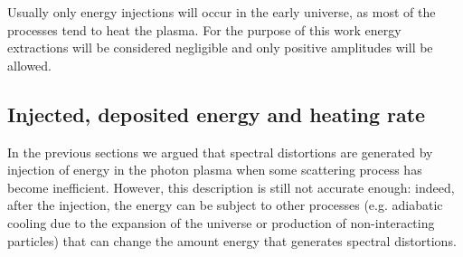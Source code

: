 Usually only energy injections will occur in the early universe, as most of the processes tend to heat the plasma. For the purpose of this work energy extractions will be considered negligible and only positive amplitudes will be allowed.

\subsection{Injected, deposited energy and heating rate}\label{sec:SD_injected_deposited_energy}
In the previous sections we argued that spectral distortions are generated by injection of energy in the photon plasma when some scattering process has become inefficient. However, this description is still not accurate enough: indeed, after the injection, the energy can be subject to other processes (e.g. adiabatic cooling due to the expansion of the universe or production of non-interacting particles) that can change the amount energy that generates spectral distortions. 

